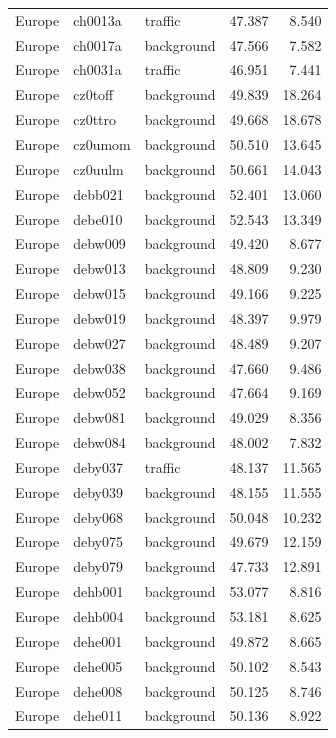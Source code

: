 \documentclass{article}
\begin{document}
\begin{longtable}{lllrr}
Europe & ch0013a & traffic & 47.387 & 8.540 \\ 
Europe & ch0017a & background & 47.566 & 7.582 \\ 
Europe & ch0031a & traffic & 46.951 & 7.441 \\ 
Europe & cz0toff & background & 49.839 & 18.264 \\ 
Europe & cz0ttro & background & 49.668 & 18.678 \\ 
Europe & cz0umom & background & 50.510 & 13.645 \\ 
Europe & cz0uulm & background & 50.661 & 14.043 \\ 
Europe & debb021 & background & 52.401 & 13.060 \\ 
Europe & debe010 & background & 52.543 & 13.349 \\ 
Europe & debw009 & background & 49.420 & 8.677 \\ 
Europe & debw013 & background & 48.809 & 9.230 \\ 
Europe & debw015 & background & 49.166 & 9.225 \\ 
Europe & debw019 & background & 48.397 & 9.979 \\ 
Europe & debw027 & background & 48.489 & 9.207 \\ 
Europe & debw038 & background & 47.660 & 9.486 \\ 
Europe & debw052 & background & 47.664 & 9.169 \\ 
Europe & debw081 & background & 49.029 & 8.356 \\ 
Europe & debw084 & background & 48.002 & 7.832 \\ 
Europe & deby037 & traffic & 48.137 & 11.565 \\ 
Europe & deby039 & background & 48.155 & 11.555 \\ 
Europe & deby068 & background & 50.048 & 10.232 \\ 
Europe & deby075 & background & 49.679 & 12.159 \\ 
Europe & deby079 & background & 47.733 & 12.891 \\ 
Europe & dehb001 & background & 53.077 & 8.816 \\ 
Europe & dehb004 & background & 53.181 & 8.625 \\ 
Europe & dehe001 & background & 49.872 & 8.665 \\ 
Europe & dehe005 & background & 50.102 & 8.543 \\ 
Europe & dehe008 & background & 50.125 & 8.746 \\ 
Europe & dehe011 & background & 50.136 & 8.922 \\ 

\end{longtable}
\end{document}
